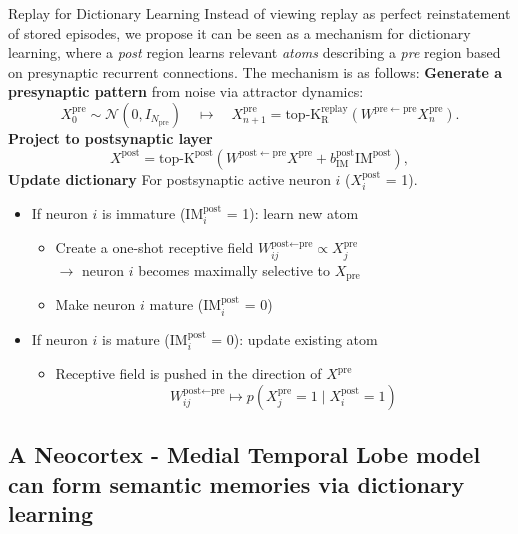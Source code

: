\documentclass{article}
\begin{document}
\begin{technicalbox}{Replay for Dictionary Learning}
Instead of viewing replay as perfect reinstatement of stored episodes, we propose it can be seen as a mechanism for dictionary learning, where a \textit{post} region learns relevant \textit{atoms} describing a \textit{pre} region based on presynaptic recurrent connections. The mechanism is as follows:
\newline\newline
\textbf{Generate a presynaptic pattern} from noise via attractor dynamics:
\[
X^\mathrm{pre}_{0} \sim \mathcal{N}(0,I_{N_\mathrm{pre}})
\quad \longmapsto \quad
X^\mathrm{pre}_{n+1}
=
\operatorname{top\text{-}K_R^{\mathrm{replay}}}
\left(
W^{\mathrm{pre}\leftarrow \mathrm{pre}} X^\mathrm{pre}_{n}
\right).
\]
\textbf{Project to postsynaptic layer}
\[
X^\mathrm{post}
=
\operatorname{top\text{-}K^\textrm{post}}
\left(
W^{\mathrm{post}\leftarrow\mathrm{pre}}X^\mathrm{pre}
+
b_\mathrm{IM}^\textrm{post}\mathrm{IM^\textrm{post}}
\right),
\]
\textbf{Update dictionary} For postsynaptic active neuron $i$ ($X^\mathrm{post}_i$ = 1).
\begin{itemize}
    \item If neuron $i$ is immature ($\textrm{IM}^\textrm{post}_i$ = 1): learn new atom
    \begin{itemize}
        \item Create a one-shot receptive field $W_{ij}^{\textrm{post}\leftarrow\textrm{pre}} \propto X^\textrm{pre}_j$ \\  
        $\longrightarrow$ neuron $i$ becomes maximally selective to $X_\textrm{pre}$
        \item Make neuron $i$ mature ($\textrm{IM}^\textrm{post}_i$ = 0)
    \end{itemize}
    \item If neuron $i$ is mature  ($\textrm{IM}^\textrm{post}_i$ = 0): update existing atom
    \begin{itemize}
        \item Receptive field is pushed in the direction of $X^\textrm{pre}$
        \[W_{ij}^{\textrm{post}\leftarrow\textrm{pre}} \longmapsto
p(X^\mathrm{pre}_j=1 \mid X^\mathrm{post}_i=1)\]
    \end{itemize}
\end{itemize}
\end{technicalbox}
\newpage
\subsection*{A Neocortex - Medial Temporal Lobe model can form semantic memories via dictionary learning}
\end{document}
